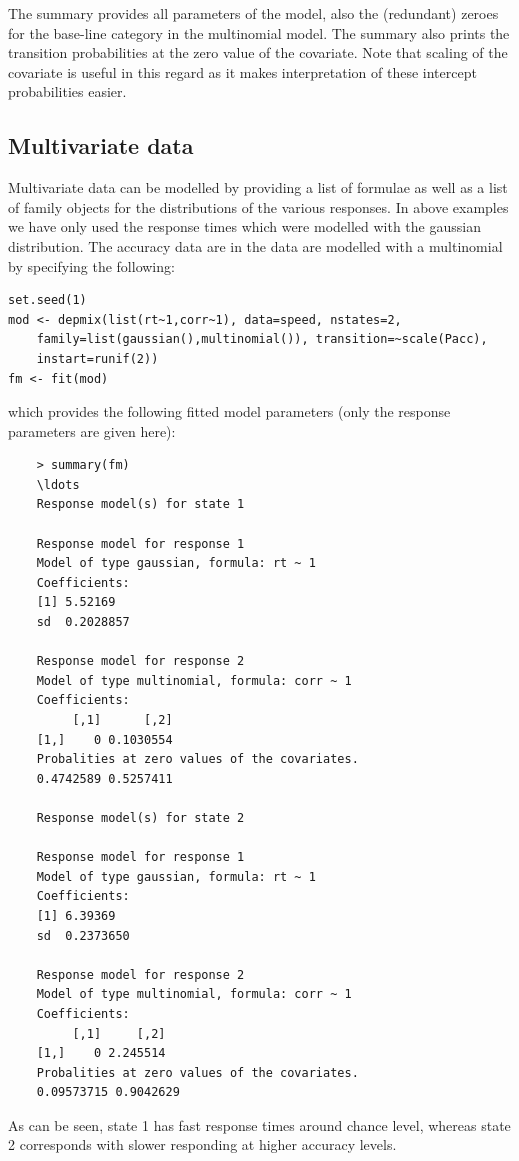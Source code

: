 \documentclass[article]{jss}
\begin{document}
The summary provides all parameters of the model, also the 
(redundant) zeroes for the base-line category in the multinomial model. 
The summary also prints the transition probabilities at the zero value 
of the covariate. Note that scaling of the covariate is useful in this 
regard as it makes interpretation of these intercept probabilities 
easier. 

\subsection{Multivariate data}

Multivariate data can be modelled by providing a list of formulae as 
well as a list of family objects for the distributions of the various 
responses. In above examples we have only used the response times 
which were modelled with the gaussian distribution. The accuracy data 
are in the  data are modelled with a multinomial by 
specifying the following: 
\begin{verbatim}
set.seed(1)
mod <- depmix(list(rt~1,corr~1), data=speed, nstates=2, 
	family=list(gaussian(),multinomial()), transition=~scale(Pacc), 
	instart=runif(2))
fm <- fit(mod)
\end{verbatim}
which provides the following fitted model parameters (only the 
response parameters are given here): 
\begin{verbatim}
	> summary(fm)
	\ldots 
	Response model(s) for state 1 

	Response model for response 1 
	Model of type gaussian, formula: rt ~ 1
	Coefficients: 
	[1] 5.52169
	sd  0.2028857 

	Response model for response 2 
	Model of type multinomial, formula: corr ~ 1
	Coefficients: 
		 [,1]      [,2]
	[1,]    0 0.1030554
	Probalities at zero values of the covariates.
	0.4742589 0.5257411 

	Response model(s) for state 2 

	Response model for response 1 
	Model of type gaussian, formula: rt ~ 1
	Coefficients: 
	[1] 6.39369
	sd  0.2373650 

	Response model for response 2 
	Model of type multinomial, formula: corr ~ 1
	Coefficients: 
		 [,1]     [,2]
	[1,]    0 2.245514
	Probalities at zero values of the covariates.
	0.09573715 0.9042629 	
\end{verbatim}
As can be seen, state 1 has fast response times around chance level, 
whereas state 2 corresponds with slower responding at higher accuracy 
levels. 
\end{document}
